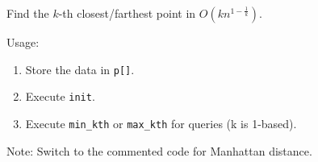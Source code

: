 Find the $k$-th closest/farthest point in $O(kn^{1-\frac{1}{k}})$.

Usage:
\begin{enumerate}
\item Store the data in \texttt{p[]}.
\item Execute \texttt{init}.
\item Execute \texttt{min\_kth} or \texttt{max\_kth} for queries (k is 1-based).
\end{enumerate}

Note: Switch to the commented code for Manhattan distance.



